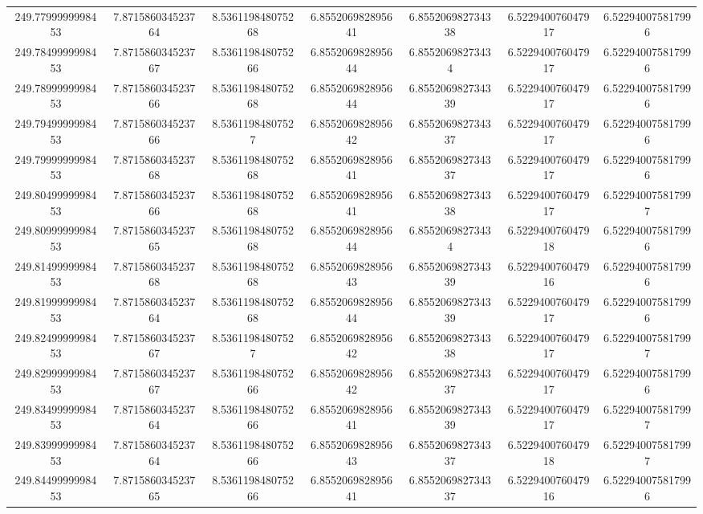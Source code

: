 \begin{center}
{\begin{tabular}{| c | c | c | c | c | c | c |}
249.7799999998453  & 7.871586034523764  & 8.536119848075268  & 6.855206982895641  & 6.855206982734338  & 6.522940076047917  & 6.522940075817996 \\
249.7849999998453  & 7.871586034523767  & 8.536119848075266  & 6.855206982895644  & 6.85520698273434  & 6.522940076047917  & 6.522940075817996 \\
249.7899999998453  & 7.871586034523766  & 8.536119848075268  & 6.855206982895644  & 6.855206982734339  & 6.522940076047917  & 6.522940075817996 \\
249.7949999998453  & 7.871586034523766  & 8.53611984807527  & 6.855206982895642  & 6.855206982734337  & 6.522940076047917  & 6.522940075817996 \\
249.7999999998453  & 7.871586034523768  & 8.536119848075268  & 6.855206982895641  & 6.855206982734337  & 6.522940076047917  & 6.522940075817996 \\
249.8049999998453  & 7.871586034523766  & 8.536119848075268  & 6.855206982895641  & 6.855206982734338  & 6.522940076047917  & 6.522940075817997 \\
249.8099999998453  & 7.871586034523765  & 8.536119848075268  & 6.855206982895644  & 6.85520698273434  & 6.522940076047918  & 6.522940075817996 \\
249.8149999998453  & 7.871586034523768  & 8.536119848075268  & 6.855206982895643  & 6.855206982734339  & 6.522940076047916  & 6.522940075817996 \\
249.8199999998453  & 7.871586034523764  & 8.536119848075268  & 6.855206982895644  & 6.855206982734339  & 6.522940076047917  & 6.522940075817996 \\
249.8249999998453  & 7.871586034523767  & 8.53611984807527  & 6.855206982895642  & 6.855206982734338  & 6.522940076047917  & 6.522940075817997 \\
249.8299999998453  & 7.871586034523767  & 8.536119848075266  & 6.855206982895642  & 6.855206982734337  & 6.522940076047917  & 6.522940075817996 \\
249.8349999998453  & 7.871586034523764  & 8.536119848075266  & 6.855206982895641  & 6.855206982734339  & 6.522940076047917  & 6.522940075817997 \\
249.8399999998453  & 7.871586034523764  & 8.536119848075266  & 6.855206982895643  & 6.855206982734337  & 6.522940076047918  & 6.522940075817997 \\
249.8449999998453  & 7.871586034523765  & 8.536119848075266  & 6.855206982895641  & 6.855206982734337  & 6.522940076047916  & 6.522940075817996 \\

\end{tabular}}
\end{center}
